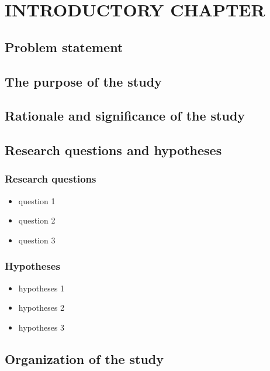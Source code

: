 \chapter{INTRODUCTORY CHAPTER}
\section{Problem statement}
\justifying
\lipsum[1]
\section{The purpose of the study}
\justifying
\lipsum[1]
\section{Rationale and significance of the study}
\justifying
\lipsum[1]
\section{Research questions and hypotheses}
\subsection{Research questions}
\justifying
\begin{itemize}
    \item question 1
    \item question 2
    \item question 3
\end{itemize}
\subsection{Hypotheses}
\justifying
\begin{itemize}
    \item hypotheses 1
    \item hypotheses 2
    \item hypotheses 3
\end{itemize}


\section{Organization of the study}
\justifying
\lipsum[1]


